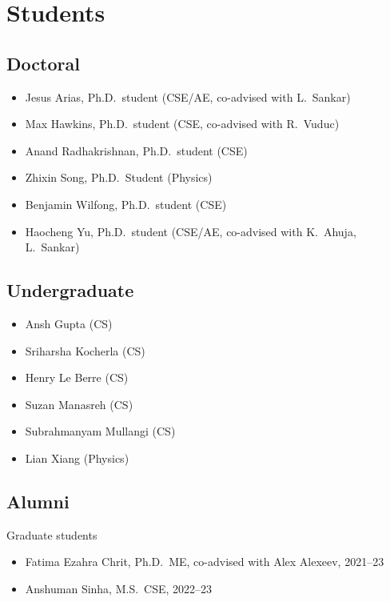 \section{Students}

\subsection{Doctoral}

\begin{itemize}
    \item Jesus Arias, Ph.D.\ student (CSE/AE, co-advised with L.\ Sankar)
    \item Max Hawkins, Ph.D.\ student (CSE, co-advised with R.\ Vuduc)
    \item Anand Radhakrishnan, Ph.D.\ student (CSE)
    \item Zhixin Song, Ph.D.\ Student (Physics)
    \item Benjamin Wilfong, Ph.D.\ student (CSE)
    \item Haocheng Yu, Ph.D.\ student (CSE/AE, co-advised with K.\ Ahuja, L.\ Sankar)
\end{itemize}

\subsection{Undergraduate}

\begin{itemize}
    \item Ansh Gupta (CS)
    \item Sriharsha Kocherla (CS)
    \item Henry Le Berre (CS)
    \item Suzan Manasreh (CS)
    \item Subrahmanyam Mullangi (CS)
    \item Lian Xiang (Physics)
\end{itemize}

\subsection{Alumni}

Graduate students
\begin{itemize}
    \item Fatima Ezahra Chrit, Ph.D.\ ME, co-advised with Alex Alexeev, 2021--23
    \item Anshuman Sinha, M.S.\ CSE, 2022--23
\end{itemize}


